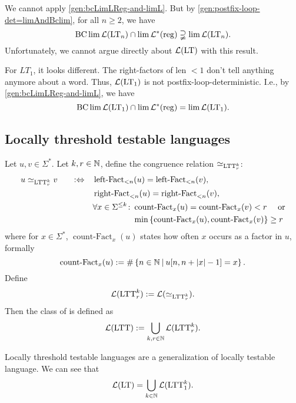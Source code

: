 We cannot apply \cref{gen:bcLimLReg-and-limL}.  But by \cref{gen:postfix-loop-det=limAndBclim}, for all $n \ge 2$, we have
\[ \operatorname{BC} \lim \mathcal{L}(\textup{\textrm{LT}}_n) \cap \lim \mathcal{L}^*(\textup{\textrm{reg}}) \supsetneqq \lim \mathcal{L}(\textup{\textrm{LT}}_n) . \]
Unfortunately, we cannot argue directly about $\mathcal{L}(\textup{\textrm{LT}})$ with this result.

For $LT_1$, it looks different. The right-factors of len $<1$ don't tell anything anymore about a word. Thus, $\mathcal{L}(\textup{\textrm{LT}}_1)$ is not postfix-loop-deterministic. I.e., by \cref{gen:bcLimLReg-and-limL}, we have
\[ \operatorname{BC} \lim \mathcal{L}(\textup{\textrm{LT}}_1) \cap \lim \mathcal{L}^*(\textup{\textrm{reg}}) = \lim \mathcal{L}(\textup{\textrm{LT}}_1) . \]



\subsection{Locally threshold testable languages}
\label{lang:LTT}
Let $u,v \in \Sigma^*$. Let $k,r \in \mathbb{N}$, define the congruence relation $\simeq_{\textup{\textrm{LTT}}^k_r}$:
\begin{alignat*}{3}
u \simeq_{\LTT^k_r} v \ \ \ && :\Leftrightarrow \ \ \ & \operatorname{left-Fact}_{<n}(u) = \operatorname{left-Fact}_{<n}(v) , \\
&&& \operatorname{right-Fact}_{<n}(u) = \operatorname{right-Fact}_{<n}(v) , \\
&&& \begin{aligned}
\forall x \in \Sigma^{\le k} \colon & \operatorname{count-Fact}_x(u) = \operatorname{count-Fact}_x(v) < r \ \ \ \ \text{or} \\
& \min \Set{\operatorname{count-Fact}_x(u), \operatorname{count-Fact}_x(v)} \ge r
\end{aligned}
\end{alignat*}
where for $x \in \Sigma^*$, $\operatorname{count-Fact}_x(u)$ states how often $x$ occurs as a factor in $u$, formally
\[ \operatorname{count-Fact}_x(u) := \#\Set{n \in \N}{u[n,n+\vert x \vert - 1] = x} . \]
Define
\[ \mathcal{L}(\textup{\textrm{LTT}}^k_r) := \mathcal{L}(\simeq_{\textup{\textrm{LTT}}^k_r}). \]
Then the class of  is defined as
\[ \mathcal{L}(\textup{\textrm{LTT}}) := \bigcup_{k,r\in\mathbb{N}} \mathcal{L}(\textup{\textrm{LTT}}^k_r) . \]

Locally threshold testable languages are a generalization of locally testable language. We can see that
\[  \mathcal{L}(\textup{\textrm{LT}}) = \bigcup_{k\in\mathbb{N}} \mathcal{L}(\textup{\textrm{LTT}}^k_1) . \]

